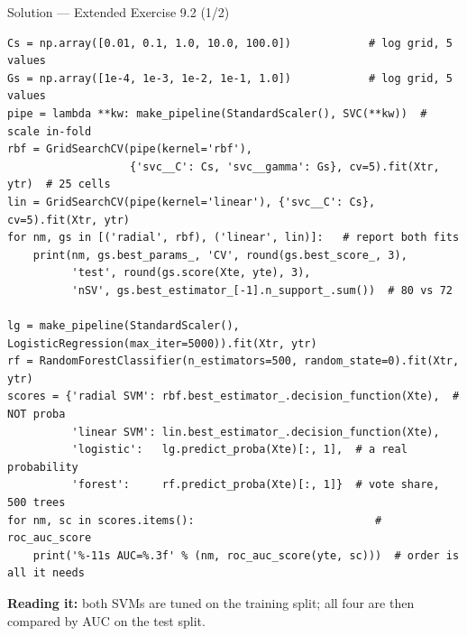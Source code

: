 \documentclass[aspectratio=169,11pt]{beamer}
\begin{document}
\begin{frame}[fragile]{Solution --- Extended Exercise 9.2 (1/2)}
\begin{solutionbox}
\begin{lstlisting}[basicstyle=\ttfamily\tiny]
Cs = np.array([0.01, 0.1, 1.0, 10.0, 100.0])            # log grid, 5 values
Gs = np.array([1e-4, 1e-3, 1e-2, 1e-1, 1.0])            # log grid, 5 values
pipe = lambda **kw: make_pipeline(StandardScaler(), SVC(**kw))  # scale in-fold
rbf = GridSearchCV(pipe(kernel='rbf'),
                   {'svc__C': Cs, 'svc__gamma': Gs}, cv=5).fit(Xtr, ytr)  # 25 cells
lin = GridSearchCV(pipe(kernel='linear'), {'svc__C': Cs}, cv=5).fit(Xtr, ytr)
for nm, gs in [('radial', rbf), ('linear', lin)]:   # report both fits
    print(nm, gs.best_params_, 'CV', round(gs.best_score_, 3),
          'test', round(gs.score(Xte, yte), 3),
          'nSV', gs.best_estimator_[-1].n_support_.sum())  # 80 vs 72

lg = make_pipeline(StandardScaler(), LogisticRegression(max_iter=5000)).fit(Xtr, ytr)
rf = RandomForestClassifier(n_estimators=500, random_state=0).fit(Xtr, ytr)
scores = {'radial SVM': rbf.best_estimator_.decision_function(Xte),  # NOT proba
          'linear SVM': lin.best_estimator_.decision_function(Xte),
          'logistic':   lg.predict_proba(Xte)[:, 1],  # a real probability
          'forest':     rf.predict_proba(Xte)[:, 1]}  # vote share, 500 trees
for nm, sc in scores.items():                            # roc_auc_score
    print('%-11s AUC=%.3f' % (nm, roc_auc_score(yte, sc)))  # order is all it needs
\end{lstlisting}
{\scriptsize\textbf{Reading it:} both SVMs are tuned on the training split;
all four are then compared by AUC on the test split.}
\end{solutionbox}
\end{frame}
\end{document}
